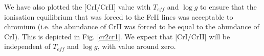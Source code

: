 \documentclass[dvips,12pt,a4paper]{report}
\begin{document}
{{%


We have also plotted the [CrI/CrII] value with $T_{eff}$ and $\log g$ to ensure that the ionisation equilibrium that was forced to the FeII lines \citep{Santos-2000b} was acceptable to chromium (i.e. the abundance of CrII was forced to be equal to the abundance of CrI). This is depicted in Fig. \ref{cr2cr1}. We expect that [CrI/CrII] will be independent of $T_{eff}$ and $\log g$, with value around zero.

}}
\end{document}
